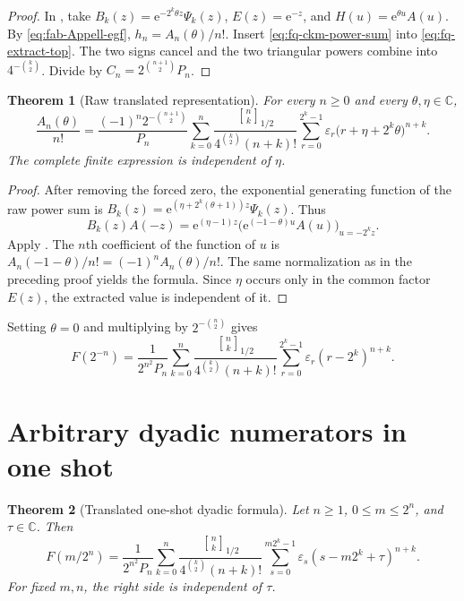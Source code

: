 \documentclass[11pt,oneside,openany]{book}
\newtheorem{theorem}{Theorem}[chapter]
\theoremstyle{definition}
\theoremstyle{remark}
\newcommand{\Qbinom}[3]{\genfrac{[}{]}{0pt}{}{#1}{#2}_{#3}}
\newcommand{\C}{\mathbb C}
\newcommand{\e}{\mathrm e}
\begin{document}
\begin{proof}
In , take
$B_k(z)=\e^{-2^k\theta z}\Psi_k(z)$,
$E(z)=\e^{-z}$, and $H(u)=\e^{\theta u}A(u)$.  By
\eqref{eq:fab-Appell-egf}, $h_n=A_n(\theta)/n!$.  Insert
\eqref{eq:fq-ckm-power-sum} into \eqref{eq:fq-extract-top}.  The two signs
cancel and the two triangular powers combine into $4^{-\binom k2}$.  Divide by
$C_n=2^{\binom{n+1}{2}}P_n$.
\end{proof}

\begin{theorem}[Raw translated representation]
\label{thm:fq-raw-Appell}
For every $n\ge0$ and every $\theta,\eta\in\C$,
\begin{equation}
 \boxed{
 \frac{A_n(\theta)}{n!}
 =\frac{(-1)^n2^{-\binom{n+1}{2}}}{P_n}
 \sum_{k=0}^{n}\frac{\Qbinom nk{1/2}}
 {4^{\binom k2}(n+k)!}
 \sum_{r=0}^{2^k-1}\varepsilon_r
 \bigl(r+\eta+2^k\theta\bigr)^{n+k}.}
 \label{eq:fq-raw-Appell}
\end{equation}
The complete finite expression is independent of $\eta$.
\end{theorem}

\begin{proof}
After removing the forced zero, the exponential generating function of the
raw power sum is
$B_k(z)=\e^{(\eta+2^k(\theta+1))z}\Psi_k(z)$.  Thus
\[
 B_k(z)A(-z)=\e^{(\eta-1)z}
 \bigl(\e^{(-1-\theta)u}A(u)\bigr)_{u=-2^kz}.
\]
Apply .  The $n$th coefficient of the
function of $u$ is
$A_n(-1-\theta)/n!=(-1)^nA_n(\theta)/n!$.  The same normalization as in the
preceding proof yields the formula.  Since $\eta$ occurs only in the common
factor $E(z)$, the extracted value is independent of it.
\end{proof}

Setting $\theta=0$ and multiplying by $2^{-\binom n2}$ gives
\begin{equation}
 \boxed{
 F(2^{-n})=
 \frac1{2^{n^2}P_n}
 \sum_{k=0}^{n}\frac{\Qbinom nk{1/2}}
 {4^{\binom k2}(n+k)!}
 \sum_{r=0}^{2^k-1}\varepsilon_r(r-2^k)^{n+k}.}
 \label{eq:fq-inverse-dyadic}
\end{equation}

\section{Arbitrary dyadic numerators in one shot}

\begin{theorem}[Translated one-shot dyadic formula]
\label{thm:fq-general-dyadic}
Let $n\ge1$, $0\le m\le2^n$, and $\tau\in\C$.  Then
\begin{equation}
 \boxed{
 F(m/2^n)=\frac1{2^{n^2}P_n}
 \sum_{k=0}^{n}\frac{\Qbinom nk{1/2}}
 {4^{\binom k2}(n+k)!}
 \sum_{s=0}^{m2^k-1}\varepsilon_s
 (s-m2^k+\tau)^{n+k}.}
 \label{eq:fq-general-dyadic}
\end{equation}
For fixed $m,n$, the right side is independent of $\tau$.
\end{theorem}
\end{document}
